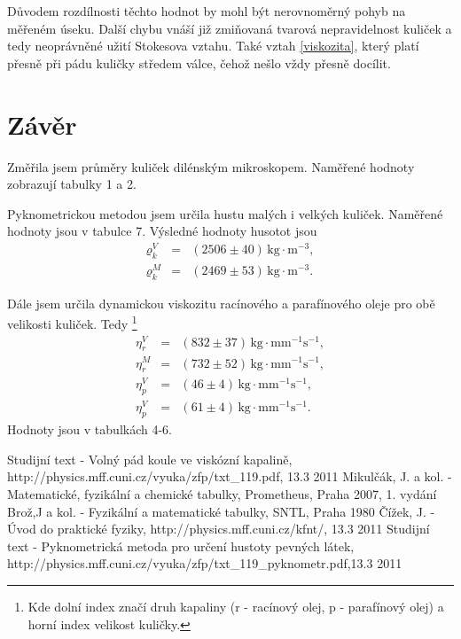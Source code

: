 \documentclass[a4paper,12pt]{article}
\begin{document}
Důvodem rozdílnosti těchto hodnot by mohl být nerovnoměrný pohyb na měřeném 
úseku. Další chybu vnáší již zmiňovaná tvarová nepravidelnost kuliček a tedy 
neoprávněné užití Stokesova vztahu. Také vztah \ref{viskozita}, který platí 
přesně při pádu kuličky středem válce, čehož nešlo vždy přesně docílit.

\section{Závěr}
Změřila jsem průměry kuliček dilénským mikroskopem. Naměřené hodnoty 
zobrazují tabulky 1 a 2.

Pyknometrickou metodou jsem určila hustu malých i velkých kuliček. 
Naměřené hodnoty jsou v tabulce 7. Výsledné hodnoty 
husotot jsou 
\begin{eqnarray}
\nonumber \varrho_{k}^{V} &=& (2506 \pm 40) \, \mathrm{kg \cdot m^{-3}}, \\
\nonumber \varrho_{k}^{M} &=& (2469 \pm 53) \, \mathrm{kg \cdot m^{-3}}.
\end{eqnarray}

Dále jsem určila dynamickou viskozitu racínového a parafínového oleje pro
obě velikosti kuliček. Tedy \footnote{Kde dolní index značí druh kapaliny (r - racínový olej, p - parafínový olej) a horní index velikost kuličky.}
\begin{eqnarray}
\nonumber \eta_{r}^{V} &=& (832 \pm 37 ) \, \mathrm{kg \cdot mm^{-1} s^{-1}},\\
\nonumber \eta_{r}^{M} &=& (732 \pm 52 ) \, \mathrm{kg \cdot mm^{-1} s^{-1}},\\
\nonumber \eta_{p}^{V} &=& (46 \pm 4 ) \, \mathrm{kg \cdot mm^{-1} s^{-1}},\\
\nonumber \eta_{p}^{V} &=& (61 \pm 4 ) \, \mathrm{kg \cdot mm^{-1} s^{-1}}.
\end{eqnarray}
Hodnoty jsou v tabulkách 4-6.

\begin{thebibliography}{99}
 Studijní text - Volný pád koule ve viskózní kapalině,\\ http://physics.mff.cuni.cz/vyuka/zfp/txt\_119.pdf, 13.3 2011
 Mikulčák, J. a kol. - Matematické, fyzikální a chemické tabulky, Prometheus, Praha 2007, 1. vydání
 Brož,J a kol. - Fyzikální a matematické tabulky, SNTL, Praha 1980
 Čížek, J. - Úvod do praktické fyziky, http://physics.mff.cuni.cz/kfnt/, 13.3 2011
 Studijní text - Pyknometrická metoda pro určení hustoty pevných látek, \\ http://physics.mff.cuni.cz/vyuka/zfp/txt\_119\_pyknometr.pdf,13.3 2011
\end{thebibliography}
\end{document}
